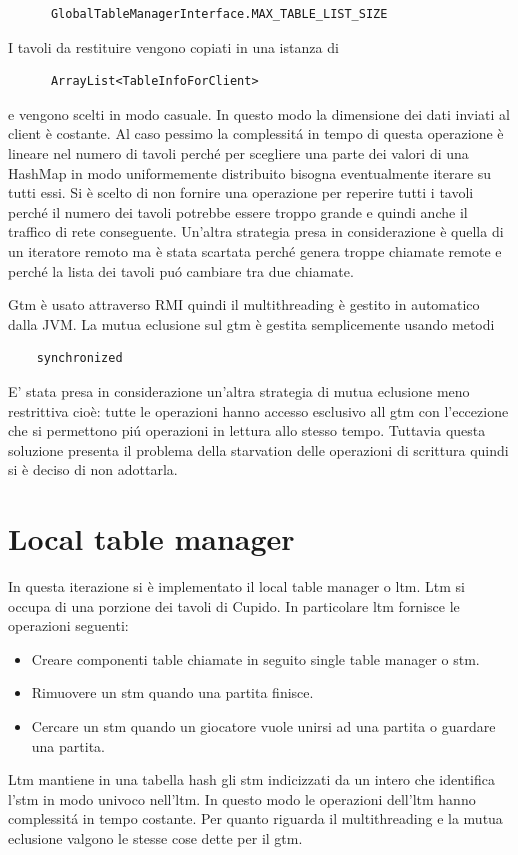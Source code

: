 \begin{description}
	\begin{verbatim}
	  GlobalTableManagerInterface.MAX_TABLE_LIST_SIZE
	\end{verbatim}
	I tavoli da restituire vengono copiati in una istanza di
	\begin{verbatim}
	  ArrayList<TableInfoForClient>
	\end{verbatim}
	e vengono scelti in modo casuale. In questo modo la dimensione dei dati inviati al client \`e costante. Al caso pessimo la complessit\'a in tempo di questa operazione \`e lineare nel numero di tavoli perch\'e per scegliere una parte dei valori di una HashMap in modo uniformemente distribuito bisogna eventualmente iterare su tutti essi. Si \`e scelto di non fornire una operazione per reperire tutti i tavoli perch\'e il numero dei tavoli potrebbe essere troppo grande e quindi anche il traffico di rete conseguente. Un'altra strategia presa in considerazione \`e quella di un iteratore remoto ma \`e stata scartata perch\'e genera troppe chiamate remote e perch\'e la lista dei tavoli pu\'o cambiare tra due chiamate.
    \end{description}
  Gtm \`e usato attraverso RMI quindi il multithreading \`e gestito in automatico dalla JVM. La mutua eclusione sul gtm \`e gestita semplicemente usando metodi \begin{verbatim}
    synchronized
  \end{verbatim} 
  E' stata presa in considerazione un'altra strategia di mutua eclusione meno restrittiva cio\`e: tutte le operazioni hanno accesso esclusivo all gtm con l'eccezione che si permettono pi\'u operazioni in lettura allo stesso tempo. Tuttavia questa soluzione presenta il problema della starvation delle operazioni di scrittura quindi si \`e deciso di non adottarla.


\section{Local table manager}
  In questa iterazione si \`e implementato il local table manager o ltm. Ltm si occupa di una porzione dei tavoli di Cupido. In particolare ltm fornisce le operazioni seguenti:
  \begin{itemize}
    \item 
      Creare componenti table chiamate in seguito single table manager o stm.
    \item 
      Rimuovere un stm quando una partita finisce.
    \item 
      Cercare un stm quando un giocatore vuole unirsi ad una partita o guardare una partita.
  \end{itemize}
  Ltm mantiene in una tabella hash gli stm indicizzati da un intero che identifica l'stm in modo univoco nell'ltm. In questo modo le operazioni dell'ltm hanno complessit\'a in tempo costante.
  Per quanto riguarda il multithreading e la mutua eclusione valgono le stesse cose dette per il gtm.

